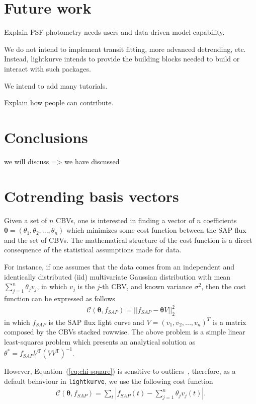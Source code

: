 \documentclass[twocolumn]{aastex62}
\newcommand{\lightkurve}{\texttt{lightkurve}}
\begin{document}
\section{Future work}

Explain PSF photometry needs users and data-driven model capability.

We do not intend to implement transit fitting, more advanced detrending, etc.
Instead, lightkurve intends to provide the building blocks needed to build
or interact with such packages.

We intend to add many tutorials.

Explain how people can contribute.


\section{Conclusions}

we will discuss => we have discussed






\appendix
\section{Cotrending basis vectors}
\label{appendix:cbvs}

Given a set of $n$ CBVs, one is interested in finding a vector of $n$
coefficients $\bm{\theta}=(\theta_1, \theta_2, ..., \theta_n)$ which minimizes
some cost function between the SAP flux and the set of CBVs. The mathematical
structure of the cost function is a direct consequence of the statistical
assumptions made for data.

For instance, if one assumes that the data comes from an independent and
identically distributed (iid) multivariate Gaussian distribution with mean
$\sum_{j=1}^{n}\theta_j v_{j}$, in which $v_j$ is the $j$-th CBV, and known
variance $\sigma^2$, then the cost function can be expressed as follows
\begin{align}
    \mathcal{C}(\bm{\theta}, f_{SAP}) = ||f_{SAP} - \bm{\theta}V||^{2}_{2}
\label{eq:chi-square}
\end{align}
in which $f_{SAP}$ is the SAP flux light curve and $V = (v_1, v_2, ..., v_n)^{T}$
is a matrix composed by the CBVs stacked rowwise. The above problem is a simple
linear least-squares problem which presents an analytical solution as
$\theta^{*} = f_{SAP}V^{\mathrm{T}}(VV^{\mathrm{T}})^{-1}$.


However, Equation~(\ref{eq:chi-square}) is sensitive to outliers~\cite{ivezi2014},
therefore, as a default behaviour in \lightkurve, we use the following cost
function
\begin{align}
    \mathcal{C}(\bm{\theta}, f_{SAP}) = \sum_{t} \left\rvert f_{SAP}(t)
    - \sum_{j=1}^{n}\theta_j v_{j}(t)\right\rvert.
\label{eq:l1-norm}
\end{align}
\end{document}

